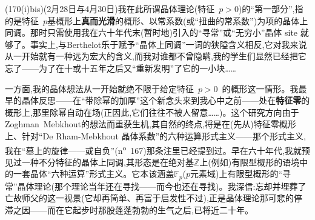 
(170(i)bis)(2月28日与4月30日)我在此所谓晶体理论(特征~$p>0$)的“第一部分”,指的是特征~$p$基概形上\textbf{真而光滑}的概形、以常系数(或“扭曲的常系数”)为项的晶体上同调。那时只需使用我在六十年代末(暂时地)引入的“寻常”或“无穷小”晶体 site 就够了。事实上,与Berthelot乐于赋予“晶体上同调”一词的狭隘含义相反,它对我来说从一开始就有一种远为\dmark{}宏大的含义,而我对谁都不曾隐瞒,我的学生们显然已经把它忘了——为了在十或十五年之后又“重新发明”了它的一小块……

一方面,我的晶体想法从一开始就绝不限于给定特征~$p>0$~的概形这一情形。我最早的晶体反思——在“带除幂的加厚”这个新念头来到我心中之前——处在\textbf{特征零}的概形上,那里除幂自动在场(正因此,它们往往不被人留意……)。这个研究方向由于Zoghman~Mebkhout的想法而重获生机,其自然的终点,将是在(先从)特征零概形上、针对“De Rham-Mebkhout 晶体系数”的六种运算形式主义——那个形式主义,我在“墓上的旋律——或自负”(n\textsuperscript{o}~167)那条注里已经提到过。早在六十年代,我就预见过一种不分特征的晶体上同调,其形态是在绝对基$\mathbb{Z}$上(例如)有限型概形的语境中的一套晶体“六种运算”形式主义。它本该涵盖$\mathbb{F}_p$($p$元素域)上有限型概形的“寻常”晶体理论(那个理论当年还在寻找——而今也还在寻找)。我深信:忘却并埋葬了亡故师父的这一视景(它却再简单、再富于启发性不过),正是晶体理论那可悲的停滞之因——而在它起步时那股蓬蓬勃勃的生气之后,已将近二十年。

